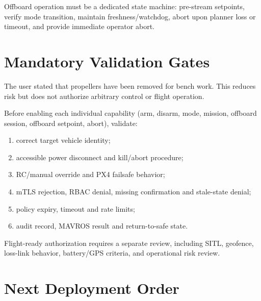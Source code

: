 \documentclass[11pt,a4paper]{article}
\begin{document}
Offboard operation must be a dedicated state machine: pre-stream setpoints,
verify mode transition, maintain freshness/watchdog, abort upon planner loss or
timeout, and provide immediate operator abort.

\section{Mandatory Validation Gates}

The user stated that propellers have been removed for bench work. This reduces
risk but does not authorize arbitrary control or flight operation.

Before enabling each individual capability (arm, disarm, mode, mission,
offboard session, offboard setpoint, abort), validate:

\begin{enumerate}
  \item correct target vehicle identity;
  \item accessible power disconnect and kill/abort procedure;
  \item RC/manual override and PX4 failsafe behavior;
  \item mTLS rejection, RBAC denial, missing confirmation and stale-state denial;
  \item policy expiry, timeout and rate limits;
  \item audit record, MAVROS result and return-to-safe state.
\end{enumerate}

Flight-ready authorization requires a separate review, including SITL,
geofence, loss-link behavior, battery/GPS criteria, and operational risk review.

\section{Next Deployment Order}
\end{document}
